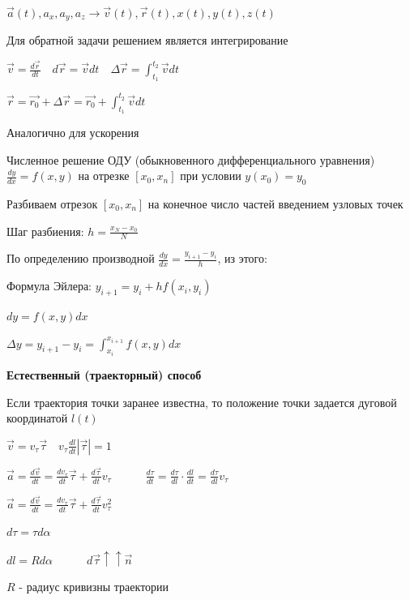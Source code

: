 \documentclass[12pt]{article}
\begin{document}
    $\vec{a}(t), a_x, a_y, a_z \longrightarrow \vec{v}(t), \vec{r}(t), x(t), y(t), z(t)$

    Для обратной задачи решением является интегрирование

    $\vec{v} = \frac{d\vec{r}}{dt} \quad d\vec{r} = \vec{v}dt \quad \Delta\vec{r} = \int_{t_1}^{t_2} \vec{v}dt$

    \begin{tcolorbox}
        $\vec{r} = \vec{r_0} + \Delta \vec{r} = \vec{r_0} + \int_{t_1}^{t_2} \vec{v}dt$
    \end{tcolorbox}

    Аналогично для ускорения

    Численное решение ОДУ (обыкновенного дифференциального уравнения) $\frac{dy}{dx} = f(x, y)$ на отрезке $[x_0, x_n]$ при условии $y(x_0) = y_0$

    Разбиваем отрезок $[x_0, x_n]$ на конечное число частей введением узловых точек

    Шаг разбиения: $h = \frac{x_N - x_0}{N}$

    По определению производной $\frac{dy}{dx} = \frac{y_{i + 1} - y_i}{h}$, из этого:

    \begin{tcolorbox}
        Формула Эйлера: $y_{i + 1} = y_i + hf(x_i, y_i)$
    \end{tcolorbox}

    $dy = f(x, y) dx$

    $\Delta y = y_{i + 1} - y_i = \int_{x_i}^{x_{i + 1}} f(x, y) dx$

    \textbf{Естественный (траекторный) способ}

    Если траектория точки заранее известна, то положение точки задается дуговой координатой $l(t)$

    $\vec{v} = v_\tau \vec{\tau} \quad v_\tau \frac{dl}{dt} |\vec{\tau}| = 1$

    $\vec{a} = \frac{d\vec{v}}{dt} = \frac{dv_\tau}{dt} \vec{\tau} + \frac{d\vec{\tau}}{dt} v_\tau \quad\quad\quad \frac{d\tau}{dt} = \frac{d\tau}{dl} \cdot \frac{dl}{dt} = \frac{d\tau}{dl} v_\tau$

    $\vec{a} = \frac{d\vec{v}}{dt} = \frac{dv_\tau}{dt} \vec{\tau} + \frac{d\vec{\tau}}{dt} v_\tau^2 $

    $d\tau = \tau d\alpha$

    $dl = R d\alpha \quad\quad\quad d\vec{\tau} \uparrow\uparrow \vec{n}$

    $R$ - радиус кривизны траектории
\end{document}
